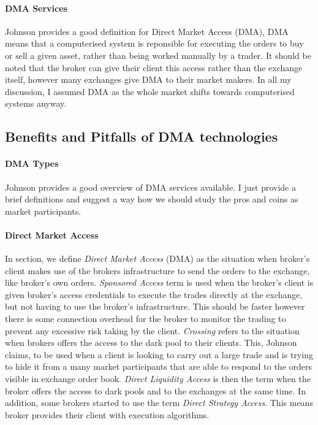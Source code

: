 \documentclass[12pt]{article}
\begin{document}
\paragraph{DMA Services} Johnson \cite{johnson} provides a good definition for Direct Market Access (DMA), DMA means that a computerised system is reponsible for executing the orders to buy or sell a given asset, rather than being worked manually by a trader. It should be noted that the broker can give their client this access rather than the exchange itself, however many exchanges give DMA to their market makers. In all my discussion, I assumed DMA as the whole market shifts towards computerised systems anyway. 
\subsection*{Benefits and Pitfalls of DMA technologies}
\paragraph*{DMA Types} Johnson \cite{johnson} provides a good overview of DMA services available. I just provide a brief definitions and suggest a way how we should study the pros and coins as market participants.

\paragraph*{Direct Market Access} In section, we define \textit{Direct Market Access} (DMA) as the situation when broker's client makes use of the brokers infrastructure to send the orders to the exchange, like broker's own orders. \textit{Sponsored Access} term is used when the broker's client is given broker's access credentials to execute the trades directly at the exchange, but not having to use the broker's infrastructure. This should be faster however there is some connection overhead for the broker to monitor the trading to prevent any excessive risk taking by the client. \textit{Crossing} refers to the situation when brokers offers the access to the dark pool to their clients. This, Johnson claims, to be used when a client is looking to carry out a large trade and is trying to hide it from a many market participants that are able to respond to the orders visible in exchange order book. \textit{Direct Liquidity Access} is then the term when the broker offers the access to dark pools and to the exchanges at the same time. In addition, some brokers started to use the term \textit{Direct Strategy Access}. This means broker provides their client with execution algorithms.
\end{document}
